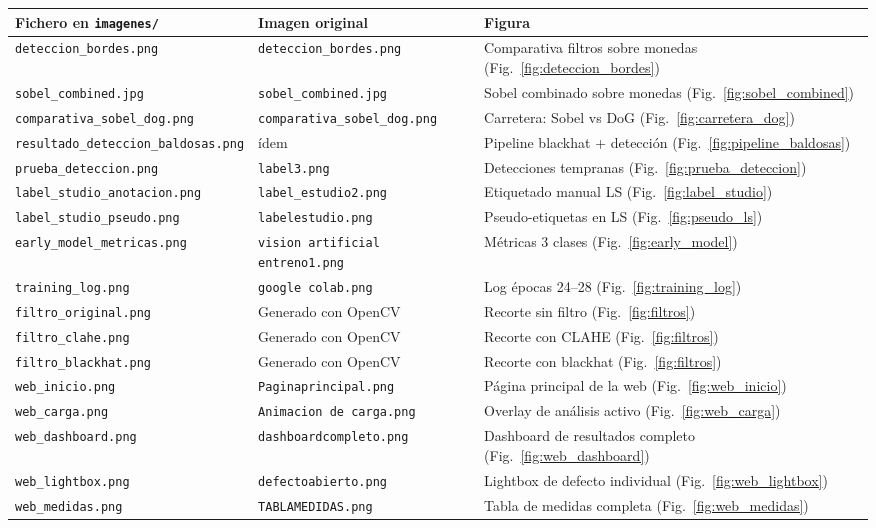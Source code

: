 \documentclass[12pt,a4paper]{article}
\begin{document}
\begin{center}
\begin{tabularx}{\linewidth}{llX}
  \toprule
  \textbf{Fichero en \texttt{imagenes/}} & \textbf{Imagen original} & \textbf{Figura} \\
  \midrule
  \texttt{deteccion\_bordes.png}       & \texttt{deteccion\_bordes.png}      & Comparativa filtros sobre monedas (Fig.~\ref{fig:deteccion_bordes}) \\
  \texttt{sobel\_combined.jpg}          & \texttt{sobel\_combined.jpg}         & Sobel combinado sobre monedas (Fig.~\ref{fig:sobel_combined}) \\
  \texttt{comparativa\_sobel\_dog.png} & \texttt{comparativa\_sobel\_dog.png} & Carretera: Sobel vs DoG (Fig.~\ref{fig:carretera_dog}) \\
  \texttt{resultado\_deteccion\_baldosas.png} & ídem & Pipeline blackhat + detección (Fig.~\ref{fig:pipeline_baldosas}) \\
  \texttt{prueba\_deteccion.png}        & \texttt{label3.png}                 & Detecciones tempranas (Fig.~\ref{fig:prueba_deteccion}) \\
  \texttt{label\_studio\_anotacion.png} & \texttt{label\_estudio2.png}        & Etiquetado manual LS (Fig.~\ref{fig:label_studio}) \\
  \texttt{label\_studio\_pseudo.png}    & \texttt{labelestudio.png}           & Pseudo-etiquetas en LS (Fig.~\ref{fig:pseudo_ls}) \\
  \texttt{early\_model\_metricas.png}   & \texttt{vision artificial entreno1.png} & Métricas 3 clases (Fig.~\ref{fig:early_model}) \\
  \texttt{training\_log.png}            & \texttt{google colab.png}           & Log épocas 24–28 (Fig.~\ref{fig:training_log}) \\
  \texttt{filtro\_original.png}         & Generado con OpenCV                 & Recorte sin filtro (Fig.~\ref{fig:filtros}) \\
  \texttt{filtro\_clahe.png}            & Generado con OpenCV                 & Recorte con CLAHE (Fig.~\ref{fig:filtros}) \\
  \texttt{filtro\_blackhat.png}         & Generado con OpenCV                 & Recorte con blackhat (Fig.~\ref{fig:filtros}) \\
  \texttt{web\_inicio.png}              & \texttt{Paginaprincipal.png}        & Página principal de la web (Fig.~\ref{fig:web_inicio}) \\
  \texttt{web\_carga.png}              & \texttt{Animacion de carga.png}     & Overlay de análisis activo (Fig.~\ref{fig:web_carga}) \\
  \texttt{web\_dashboard.png}          & \texttt{dashboardcompleto.png}      & Dashboard de resultados completo (Fig.~\ref{fig:web_dashboard}) \\
  \texttt{web\_lightbox.png}           & \texttt{defectoabierto.png}         & Lightbox de defecto individual (Fig.~\ref{fig:web_lightbox}) \\
  \texttt{web\_medidas.png}            & \texttt{TABLAMEDIDAS.png}           & Tabla de medidas completa (Fig.~\ref{fig:web_medidas}) \\
  \bottomrule
\end{tabularx}
\end{center}
\end{document}

